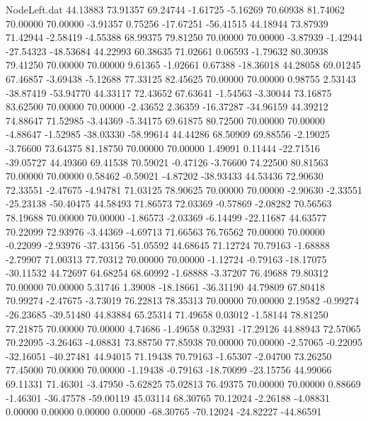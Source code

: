 \begin{filecontents}{NodeLeft.dat}
  44.13883   73.91357   69.24744    -1.61725   -5.16269   70.60938   81.74062   70.00000   70.00000   -3.91357    0.75256  -17.67251  -56.41515
  44.18944   73.87939   71.42944    -2.58419   -4.55388   68.99375   79.81250   70.00000   70.00000   -3.87939   -1.42944  -27.54323  -48.53684
  44.22993   60.38635   71.02661     0.06593   -1.79632   80.30938   79.41250   70.00000   70.00000    9.61365   -1.02661    0.67388  -18.36018
  44.28058   69.01245   67.46857    -3.69438   -5.12688   77.33125   82.45625   70.00000   70.00000    0.98755    2.53143  -38.87419  -53.94770
  44.33117   72.43652   67.63641    -1.54563   -3.30044   73.16875   83.62500   70.00000   70.00000   -2.43652    2.36359  -16.37287  -34.96159
  44.39212   74.88647   71.52985    -3.44369   -5.34175   69.61875   80.72500   70.00000   70.00000   -4.88647   -1.52985  -38.03330  -58.99614
  44.44286   68.50909   69.88556    -2.19025   -3.76600   73.64375   81.18750   70.00000   70.00000    1.49091    0.11444  -22.71516  -39.05727
  44.49360   69.41538   70.59021    -0.47126   -3.76600   74.22500   80.81563   70.00000   70.00000    0.58462   -0.59021   -4.87202  -38.93433
  44.53436   72.90630   72.33551    -2.47675   -4.94781   71.03125   78.90625   70.00000   70.00000   -2.90630   -2.33551  -25.23138  -50.40475
  44.58493   71.86573   72.03369    -0.57869   -2.08282   70.56563   78.19688   70.00000   70.00000   -1.86573   -2.03369   -6.14499  -22.11687
  44.63577   70.22099   72.93976    -3.44369   -4.69713   71.66563   76.76562   70.00000   70.00000   -0.22099   -2.93976  -37.43156  -51.05592
  44.68645   71.12724   70.79163    -1.68888   -2.79907   71.00313   77.70312   70.00000   70.00000   -1.12724   -0.79163  -18.17075  -30.11532
  44.72697   64.68254   68.60992    -1.68888   -3.37207   76.49688   79.80312   70.00000   70.00000    5.31746    1.39008  -18.18661  -36.31190
  44.79809   67.80418   70.99274    -2.47675   -3.73019   76.22813   78.35313   70.00000   70.00000    2.19582   -0.99274  -26.23685  -39.51480
  44.83884   65.25314   71.49658     0.03012   -1.58144   78.81250   77.21875   70.00000   70.00000    4.74686   -1.49658    0.32931  -17.29126
  44.88943   72.57065   70.22095    -3.26463   -4.08831   73.88750   77.85938   70.00000   70.00000   -2.57065   -0.22095  -32.16051  -40.27481
  44.94015   71.19438   70.79163    -1.65307   -2.04700   73.26250   77.45000   70.00000   70.00000   -1.19438   -0.79163  -18.70099  -23.15756
  44.99066   69.11331   71.46301    -3.47950   -5.62825   75.02813   76.49375   70.00000   70.00000    0.88669   -1.46301  -36.47578  -59.00119
  45.03114   68.30765   70.12024    -2.26188   -4.08831    0.00000    0.00000    0.00000    0.00000  -68.30765  -70.12024  -24.82227  -44.86591

\end{filecontents}
